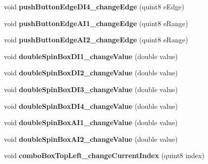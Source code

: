 \begin{DoxyCompactItemize}
void {\bfseries push\+Button\+Edge\+D\+I4\+\_\+change\+Edge} (quint8 e\+Edge)
\item 
\mbox{\label{class_trigger_window_a58297787f303c980b7ddb05b20199c9d}} 
void {\bfseries push\+Button\+Edge\+A\+I1\+\_\+change\+Edge} (quint8 e\+Range)
\item 
\mbox{\label{class_trigger_window_a0a7a2e5469d1b432ebe532f01f4c4c30}} 
void {\bfseries push\+Button\+Edge\+A\+I2\+\_\+change\+Edge} (quint8 e\+Range)
\item 
\mbox{\label{class_trigger_window_a53142b29ffb486704c757d29d7cadf19}} 
void {\bfseries double\+Spin\+Box\+D\+I1\+\_\+change\+Value} (double value)
\item 
\mbox{\label{class_trigger_window_aa5a0307d16ed6244ff5f0377c4cfadf3}} 
void {\bfseries double\+Spin\+Box\+D\+I2\+\_\+change\+Value} (double value)
\item 
\mbox{\label{class_trigger_window_a86f79e235450bf16dc623f0d09b6e7b2}} 
void {\bfseries double\+Spin\+Box\+D\+I3\+\_\+change\+Value} (double value)
\item 
\mbox{\label{class_trigger_window_a4eb97ff282139a7cc788b5d1b802e9b4}} 
void {\bfseries double\+Spin\+Box\+D\+I4\+\_\+change\+Value} (double value)
\item 
\mbox{\label{class_trigger_window_a574cc4e6553366c96f8eced69cca1608}} 
void {\bfseries double\+Spin\+Box\+A\+I1\+\_\+change\+Value} (double value)
\item 
\mbox{\label{class_trigger_window_a66b12d4ca0dc24a1aa5c4849c6e57119}} 
void {\bfseries double\+Spin\+Box\+A\+I2\+\_\+change\+Value} (double value)
\item 
\mbox{\label{class_trigger_window_a56e5445c3a6b6ddcfaa3191c83a6a960}} 
void {\bfseries combo\+Box\+Top\+Left\+\_\+change\+Current\+Index} (quint8 index)
\item 
\mbox{\label{class_trigger_window_afbbbd53d1dc2d550878292636299a251}} 

\end{DoxyCompactItemize}
